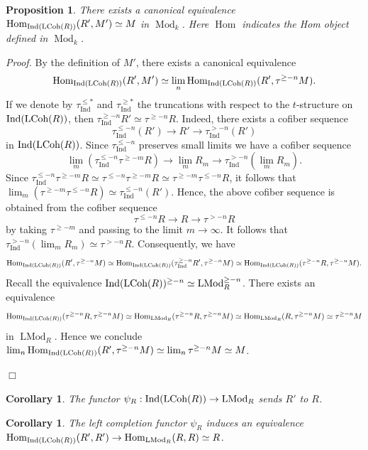 \documentclass[leqno,12pt]{amsart}
\theoremstyle{plain}
\newtheorem{Proposition}[Theorem]{Proposition}
\newtheorem{Corollary}[Theorem]{Corollary}
\theoremstyle{definition}
\newcommand{\Hom}{\operatorname{Hom}}
\newcommand{\Mod}{\operatorname{Mod}}
\newcommand{\Ind}{\operatorname{Ind}}
\newcommand{\LMod}{\operatorname{LMod}}
\newcommand{\Proof}{{\sl Proof.}\quad}
\newcommand{\QED}{{\unskip\nobreak\hfil\penalty50\quad\null\nobreak\hfil
{$\Box$}\parfillskip0pt\finalhyphendemerits0\par\medskip}}
\begin{document}
\begin{Proposition}
\label{homind}
There exists a canonical equivalence
$\Hom_{\Ind(\textup{LCoh}(R))}(R',M')\simeq M$
in $\Mod_k$.  Here $\Hom$ indicates the Hom object defined in $\Mod_k$.
\end{Proposition}


\Proof
By the definition of $M'$, there exists a canonical equivalence
\[
\Hom_{\Ind(\textup{LCoh}(R))}(R',M')\simeq \lim_n\Hom_{\Ind(\textup{LCoh}(R))}(R',\tau^{\ge-n}M).
\]
If we denote by $\tau^{\le *}_{\Ind}$ and $\tau^{\ge *}_{\Ind}$ the truncations with respect to the $t$-structure on $\Ind(\textup{LCoh}(R))$,
then $\tau^{\ge -n}_{\Ind}R'\simeq \tau^{\ge-n}R$.
Indeed, there exists a cofiber sequence 
\[
\tau^{\le-n}_{\Ind}(R')\to R' \to \tau^{>-n}_{\Ind}(R')
\]
in $\Ind(\textup{LCoh}(R))$.
Since $\tau^{\le-n}_{\Ind}$ preserves small limits
 we have a cofiber sequence
\[
\lim_m(\tau^{\le-n}_{\Ind}\tau^{\ge-m}R)\to \lim_mR_m \to \tau^{>-n}_{\Ind}(\lim_mR_m).
\]
Since 
$\tau^{\le-n}_{\Ind}\tau^{\ge-m}R\simeq \tau^{\le-n}\tau^{\ge-m}R\simeq \tau^{\ge-m}\tau^{\le-n}R$,
it follows that $\lim_m(\tau^{\ge-m}\tau^{\le-n}R)\simeq \tau^{\le-n}_{\Ind}(R')$.
Hence, the above cofiber sequence is obtained from the cofiber sequence
\[
\tau^{\le-n}R\to R \to \tau^{>-n}R
\]
by taking $\tau^{\ge-m}$ and passing to the limit $m\to \infty$. It follows that $\tau^{>-n}_{\Ind}(\lim_mR_m)\simeq \tau^{>-n}R$.
Consequently, we have
\[
\Hom_{\Ind(\textup{LCoh}(R))}(R',\tau^{\ge-n}M)\simeq \Hom_{\Ind(\textup{LCoh}(R))}(\tau^{\ge-n}_{\Ind}R',\tau^{\ge-n}M)\simeq \Hom_{\Ind(\textup{LCoh}(R))}(\tau^{\ge-n}R,\tau^{\ge-n}M).
\]
Recall the equivalence $\Ind(\textup{LCoh}(R))^{\ge-n}\simeq \LMod_R^{\ge-n}$.
There exists an equivalence 
\[
\Hom_{\Ind(\textup{LCoh}(R))}(\tau^{\ge-n}R,\tau^{\ge-n}M)\simeq \Hom_{\LMod_R}(\tau^{\ge-n}R,\tau^{\ge-n}M)\simeq \Hom_{\LMod_R}(R,\tau^{\ge-n}M)\simeq \tau^{\ge-n}M
\]
in $\LMod_R$.
Hence we conclude $\lim_n\Hom_{\Ind(\textup{LCoh}(R))}(R',\tau^{\ge-n}M)\simeq \lim_n\tau^{\ge-n}M\simeq M$.
\QED


\begin{Corollary}
\label{nonecor}
The functor $\psi_R:\Ind(\textup{LCoh}(R))\to \LMod_R$
sends $R'$ to $R$.
\end{Corollary}




\begin{Corollary}
\label{nonecor2}
The left completion functor $\psi_R$ induces an equivalence
$\Hom_{\Ind(\textup{LCoh}(R))}(R',R')\to \Hom_{\LMod_R}(R,R)\simeq R$.
\end{Corollary}
\end{document}
